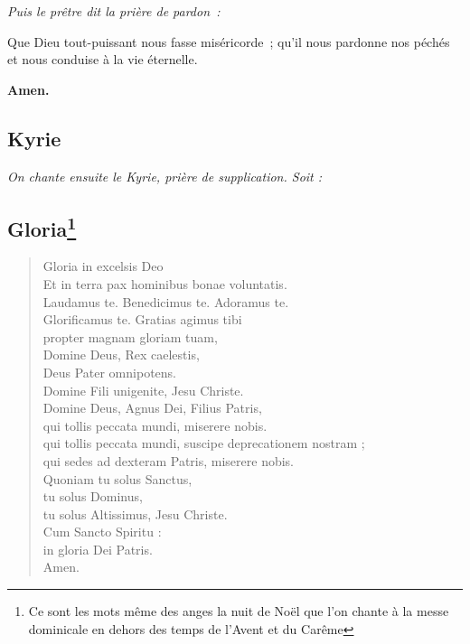 \emph{Puis le prêtre dit la prière de pardon~:}

Que Dieu tout-puissant
nous fasse miséricorde~;
qu'il nous pardonne nos péchés
et nous conduise à la vie éternelle.

{\bf Amen.}



\subsection*{Kyrie}
\emph{On chante ensuite le Kyrie, prière de supplication. Soit :}





\subsection*{Gloria\footnote{Ce sont les mots même des anges la nuit de Noël que 
l'on chante à la messe dominicale en dehors des temps de l'Avent et du Carême}}

\begin{verse}
Gloria in excelsis Deo\\
Et in terra pax hominibus bonae voluntatis.\\
Laudamus te. Benedicimus te. Adoramus te.\\
Glorificamus te. Gratias agimus tibi\\
propter magnam gloriam tuam,\\
Domine Deus, Rex caelestis,\\
Deus Pater omnipotens.\\
Domine Fili unigenite, Jesu Christe.\\
Domine Deus, Agnus Dei, Filius Patris,\\
qui tollis peccata mundi, miserere nobis.\\
qui tollis peccata mundi, suscipe deprecationem nostram ;\\
qui sedes ad dexteram Patris, miserere nobis.\\
Quoniam tu solus Sanctus,\\
tu solus Dominus,\\
tu solus Altissimus, Jesu Christe.\\
Cum Sancto Spiritu :\\
in gloria Dei Patris. \\
Amen.\\
\end{verse}

